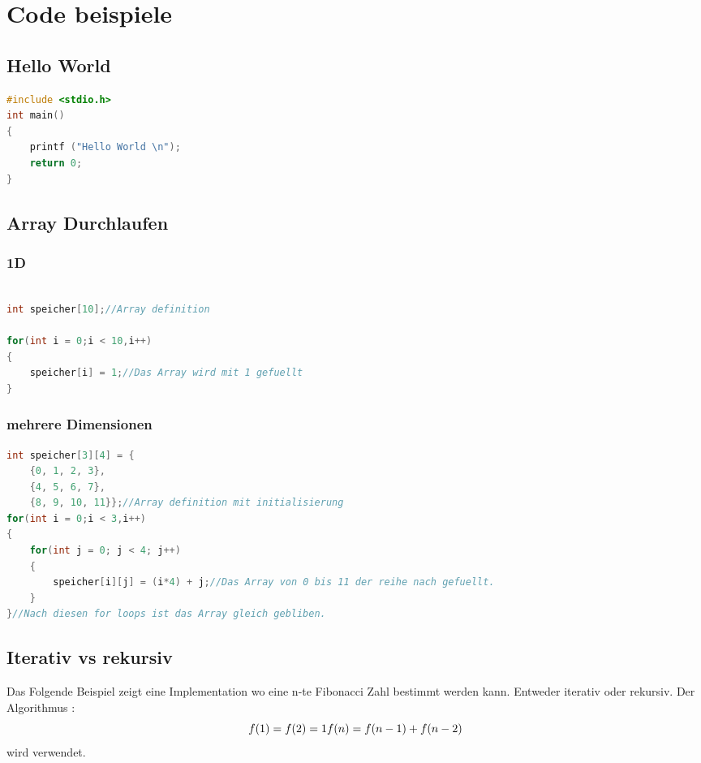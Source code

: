 \section{Code beispiele}

\subsection{Hello World}

\begin{lstlisting}[language = c]
#include <stdio.h>
int main()
{
    printf ("Hello World \n");
    return 0;
}
\end{lstlisting}

\subsection{Array Durchlaufen}

\subsubsection{1D}

\begin{lstlisting}[language = c]

int speicher[10];//Array definition

for(int i = 0;i < 10,i++)
{
    speicher[i] = 1;//Das Array wird mit 1 gefuellt
}
\end{lstlisting}

\subsubsection{mehrere Dimensionen}

\begin{lstlisting}[language = c]
int speicher[3][4] = {
    {0, 1, 2, 3},
    {4, 5, 6, 7},
    {8, 9, 10, 11}};//Array definition mit initialisierung
for(int i = 0;i < 3,i++)
{
    for(int j = 0; j < 4; j++)
    {
        speicher[i][j] = (i*4) + j;//Das Array von 0 bis 11 der reihe nach gefuellt.  
    }
}//Nach diesen for loops ist das Array gleich gebliben.
\end{lstlisting}

\subsection{Iterativ vs rekursiv}

Das Folgende Beispiel zeigt eine Implementation wo eine n-te Fibonacci Zahl bestimmt werden kann. Entweder iterativ oder rekursiv.\newline
Der Algorithmus : \[ f(1) = f(2) = 1 \newline f(n) = f(n-1) + f(n-2) \] wird verwendet.

